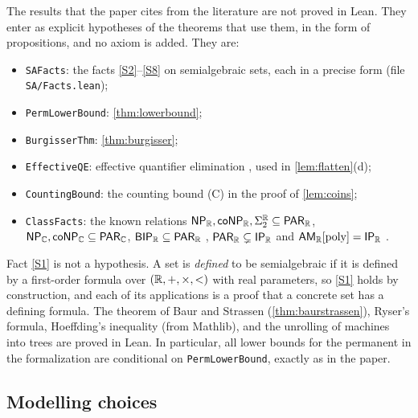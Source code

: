 The results that the paper cites from the literature are not proved in Lean. They enter as explicit hypotheses of the theorems that use them, in the form of propositions, and no axiom is added. They are:
\begin{itemize}[leftmargin=1.6em,itemsep=1pt]
\item \texttt{SAFacts}: the facts \ref{S2}--\ref{S8} on semialgebraic sets, each in a precise form (file \texttt{SA/Facts.lean});
\item \texttt{PermLowerBound}: \cref{thm:lowerbound};
\item \texttt{BurgisserThm}: \cref{thm:burgisser};
\item \texttt{EffectiveQE}: effective quantifier elimination \cite[Theorem~14.16]{BPR06}, used in \cref{lem:flatten}(d);
\item \texttt{CountingBound}: the counting bound (C) in the proof of \cref{lem:coins};
\item \texttt{ClassFacts}: the known relations $\textsf{\upshape NP}_{\mathbb{R}},\textsf{\upshape coNP}_{\mathbb{R}},\Sigma_2^{\mathbb{R}}\subseteq\textsf{\upshape PAR}_{\mathbb{R}}$, $\textsf{\upshape NP}_{\mathbb{C}},\textsf{\upshape coNP}_{\mathbb{C}}\subseteq\textsf{\upshape PAR}_{\mathbb{C}}$, $\textsf{\upshape BIP}_{\mathbb{R}}\subseteq\textsf{\upshape PAR}_{\mathbb{R}}$ \cite{IdR99}, $\textsf{\upshape PAR}_{\mathbb{R}}\subsetneq\textsf{\upshape IP}_{\mathbb{R}}$ and $\textsf{\upshape AM}_{\mathbb{R}}[\mathrm{poly}]=\textsf{\upshape IP}_{\mathbb{R}}$ \cite{BM16}.
\end{itemize}
Fact \ref{S1} is not a hypothesis. A set is \emph{defined} to be semialgebraic if it is defined by a first-order formula over $(\mathbb{R},+,\times,<)$ with real parameters, so \ref{S1} holds by construction, and each of its applications is a proof that a concrete set has a defining formula. The theorem of Baur and Strassen (\cref{thm:baurstrassen}), Ryser's formula, Hoeffding's inequality (from Mathlib), and the unrolling of machines into trees are proved in Lean. In particular, all lower bounds for the permanent in the formalization are conditional on \texttt{PermLowerBound}, exactly as in the paper.

\subsection{Modelling choices}

